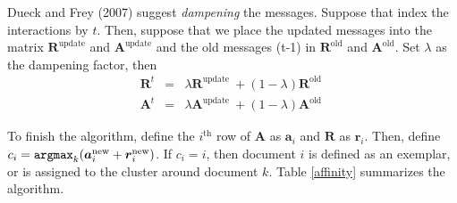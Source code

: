 \documentclass[11pt,letterpaper]{article}
\numberwithin{equation}{section}
\begin{document}
Dueck and Frey (2007) suggest \emph{dampening} the messages. Suppose
that index the interactions by $t$.  Then, suppose that we place the
updated messages into the matrix $\boldsymbol{R}^{\text{update}}$
and $\boldsymbol{A}^{\text{update}}$ and the old messages (t-1) in
$\boldsymbol{R}^{\text{old}}$ and $\boldsymbol{A}^{\text{old}}$. Set
$\lambda$ as the dampening factor, then
\begin{eqnarray}
\boldsymbol{R}^{t} & = & \lambda \boldsymbol{R}^{\text{update }} +
(1- \lambda ) \boldsymbol{R}^{\text{old }} \nonumber \\
\boldsymbol{A}^{t} & = & \lambda \boldsymbol{A}^{\text{update }} +
(1- \lambda ) \boldsymbol{A}^{\text{old }} \nonumber
\end{eqnarray}

To finish the algorithm, define the $i^{\text{th}}$ row of
$\boldsymbol{A}$ as $\boldsymbol{a}_i$ and $\boldsymbol{R}$ as
$\boldsymbol{r}_i$.  Then, define $c_i = {\tt arg max}_k
(\boldsymbol{a}_i^{\text{new}} + \boldsymbol{r}_i^{\text{new}}) $.
If $c_i = i$, then document $i$ is defined as an exemplar, or is
assigned to the cluster around document $k$.  Table \ref{affinity}
summarizes the algorithm.
\begin{table}[hbt!]
\caption{Affinity Propagation} \label{affinity} 
\end{table}
\end{document}
